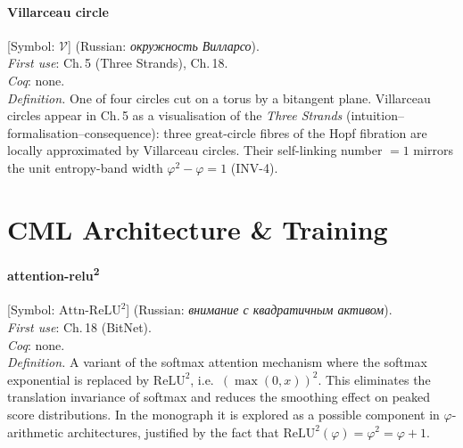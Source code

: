 \paragraph*{\textmd{\textbf{Villarceau circle}}}
\label{entry:villarceau}
[Symbol: $\mathcal{V}$] (Russian: \textit{окружность Виллар\-со}).\\
\textit{First use}: Ch.\,5 (Three Strands), Ch.\,18.\\
\textit{Coq}: none.\\
\textit{Definition.}
One of four circles cut on a torus by a bitangent plane.
Villarceau circles appear in Ch.\,5 as a visualisation of the
\emph{Three Strands} (intuition–formalisation–consequence):
three great-circle fibres of the Hopf fibration are locally
approximated by Villarceau circles.
Their self-linking number $= 1$ mirrors the unit entropy-band width
$\varphi^2 - \varphi = 1$ (INV-4).

\bigskip

\section*{C\quad ML Architecture \& Training}
\label{sec:lexicon-ml}

\paragraph*{\textmd{\textbf{attention-relu\textsuperscript{2}}}}
\label{entry:attention-relu2}
[Symbol: $\mathrm{Attn}\text{-}\mathrm{ReLU}^2$] (Russian: \textit{внимание с квадратичным активом}).\\
\textit{First use}: Ch.\,18 (BitNet).\\
\textit{Coq}: none.\\
\textit{Definition.}
A variant of the softmax attention mechanism where the softmax
exponential is replaced by $\mathrm{ReLU}^2$, i.e.\ $(\max(0,x))^2$.
This eliminates the translation invariance of softmax and reduces
the smoothing effect on peaked score distributions.
In the monograph it is explored as a possible component in
$\varphi$-arithmetic architectures, justified by the fact that
$\mathrm{ReLU}^2(\varphi) = \varphi^2 = \varphi + 1$.

